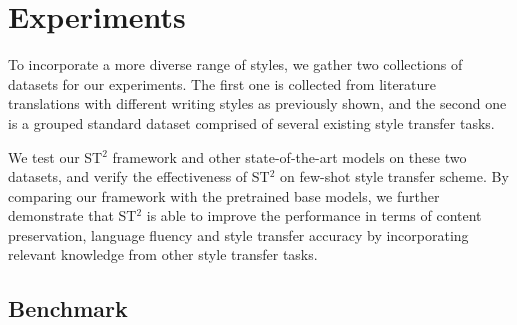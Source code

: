 \section{Experiments}
\label{sec:eval}
To incorporate a more diverse range of styles, we gather two collections of datasets for our experiments. The first one is collected from literature translations with different writing styles as previously shown, and the second one is a grouped standard dataset comprised of several existing style transfer tasks.

We test our ST$^2$ framework and other state-of-the-art models on these two datasets, and verify the effectiveness of ST$^2$ on few-shot style transfer scheme. By comparing our framework with the pretrained base models, we further demonstrate that ST$^2$ is able to improve the performance
in terms of content preservation, language fluency and style transfer accuracy by incorporating relevant knowledge from other style transfer tasks.



\subsection{Benchmark}


